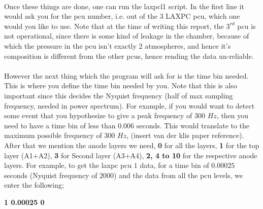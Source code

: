 \documentclass[a4paper,twoside]{report}
\numberwithin{equation}{section}
\begin{document}
\paragraph{}
Once these things are done, one can run the laxpcl1 script. In the first line it would ask you for the pcu number, i.e. out of the $3$ LAXPC pcu, which one would you like to use. Note that at the time of writing this report, the $3^{rd}$ pcu is not operational, since there is some kind of leakage in the chamber, because of which the pressure in the pcu isn't exactly 2 atmospheres, and hence it's composition is different from the other pcus, hence rending the data un-reliable. 
\paragraph{}
However the next thing which the program will ask for is the time bin needed. This is where you define the time bin needed by you. Note that this is also important since this decides the Nyquist frequency (half of max sampling frequency, needed in power spectrum). For example, if you would want to detect some event that you hypothesize to give a peak frequency of $300$ $Hz$, then you need to have a time bin of less than 0.006 seconds. This would translate to the maximum possible frequency of $300$ $Hz$, (insert van der klis paper reference). After that we mention the anode layers we need, \textbf{0} for all the layers, \textbf{1} for the top layer (A1+A2), \textbf{3} for Second layer (A3+A4), \textbf{2, 4 to 10} for the respective anode layers. For example, to get the laxpc pcu $1$ data, for a time bin of $0.00025$ seconds (Nyquist frequency of $2000$) and the data from all the pcu levels, we enter the following;
\begin{center}
\textbf{1 0.00025 0}
\end{center}
\end{document}
